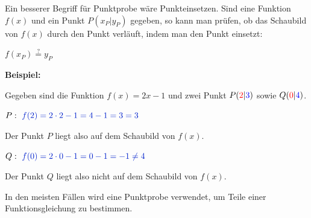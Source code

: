 Ein besserer Begriff für Punktprobe wäre Punkteinsetzen. Sind eine Funktion \(f(x)\) und ein Punkt \(P(x_P\vert y_P)\) gegeben, so kann man prüfen, ob das Schaubild von \(f(x)\) durch den Punkt verläuft, indem man den Punkt einsetzt:
\begin{tcolorbox}
	\centering
	\textcolor{loestc}{\(f(x_P)\overset{?}{=}y_P\)}
\end{tcolorbox}

\textbf{Beispiel:}

Gegeben sind die Funktion \(f(x)=2x-1\) und zwei Punkt \(P(\textcolor{red}{2}\vert\textcolor{blue}{3})\) sowie \(Q(\textcolor{red}{0}\vert\textcolor{blue}{4})\).

\(P:\ \textcolor{loes}{f(2)=2\cdot 2-1=4-1=3=3}\)

Der Punkt \(P\) liegt also auf dem Schaubild von \(f(x)\).

\(Q:\ \textcolor{loes}{f(0)=2\cdot 0-1=0-1=-1\neq4}\)

Der Punkt \(Q\) liegt also nicht auf dem Schaubild von \(f(x)\).

In den meisten Fällen wird eine Punktprobe verwendet, um Teile einer Funktionsgleichung zu bestimmen.

\medskip

